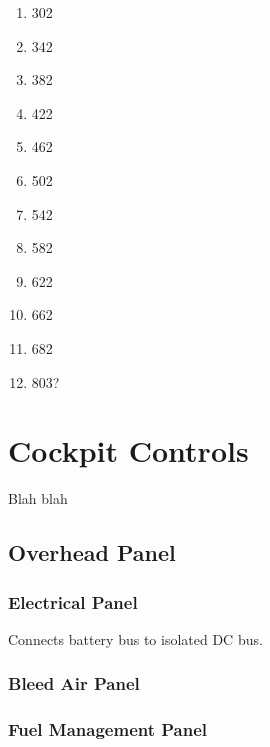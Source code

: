 \begin{enumerate}
  \item 302
  \item 342
  \item 382
  \item 422
  \item 462
  \item 502
  \item 542
  \item 582
  \item 622
  \item 662
  \item 682
  \item 803?
\end{enumerate}


\chapter{Cockpit Controls}

Blah blah

\section{Overhead Panel}

\subsection{Electrical Panel}

\begin{enumerate}
   Connects battery bus to isolated DC bus.
\end{enumerate}

\subsection{Bleed Air Panel}
\label{sec:bleed-air-panel}

\begin{enumerate}
\end{enumerate}

\subsection{Fuel Management Panel}

